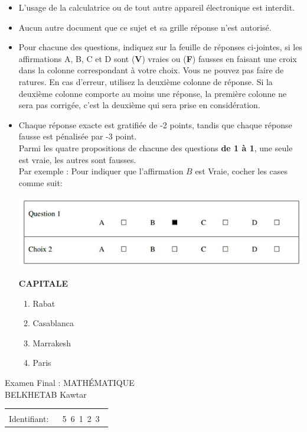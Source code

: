 \documentclass{book}%
\begin{document}
\begin{itemize}%
\item%
L'usage de la calculatrice ou de tout autre appareil électronique est interdit.%
\item%
Aucun autre document que ce sujet et sa grille réponse n'est autorisé.%
\item%
Pour chacune des questions, indiquez sur la feuille de réponses ci-jointes, si les affirmations A, B, C et D sont (\textbf{V}) vraies ou (\textbf{F}) fausses en faisant une croix dans la colonne correspondant à votre choix. Vous ne pouvez pas faire de ratures. En cas d'erreur, utilisez la deuxième colonne de réponse. Si la deuxième colonne comporte au moins une réponse, la première colonne ne sera pas corrigée, c'est la deuxième qui sera prise en considération.%
\item%
Chaque réponse exacte est gratifiée de -2 points, tandis que chaque réponse fausse est pénalisée par -3 point. \\ 	Parmi les quatre propositions de chacune des questions \textbf{de 1 à 1}, une seule est vraie, les autres sont fausses. \\ 	Par exemple : Pour indiquer que l'affirmation $B$ est Vraie, cocher les cases comme suit:  \\ \begin{center}	\includegraphics[scale=0.8]{reponses.png} \end{center}%
\thispagestyle{empty}%
\begin{exercise}%
\textbf{CAPITALE }%
\begin{enumerate}[label=\textbf{\Alph*. }]%
\item%
Rabat%
\item%
Casablanca%
\item%
Marrakesh%
\item%
Paris%
\end{enumerate}%
\end{exercise}%
\end{itemize}%
\newpage%
\thispagestyle{empty}%
Examen Final : MATHÉMATIQUE $\qquad \qquad \qquad \qquad \qquad \qquad \qquad \qquad$ BELKHETAB Kawtar%
\begin{flushright}%
\begin{tabular}{|l|}%
\hline%
 \\%
\thispagestyle{empty}%
Identifiant: $\quad$ {\Large 5~6~1~2~3~}%
 \\%
\hline%
\end{tabular}%
\end{flushright}%
\end{document}
